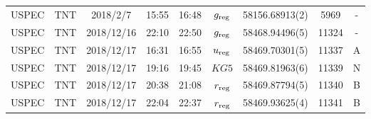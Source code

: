 \begin{table}
\begin{center}
\begin{tabular}{ccccccccc}
			USPEC & TNT     & 2018/2/7   & 15:55 & 16:48 & $g_{\rm reg}$                         & 58156.68913(2) &  5969 & - \\
			USPEC & TNT     & 2018/12/16 & 22:10 & 22:50 & $g_{\rm reg}$                         & 58468.94496(5) & 11324 & - \\
			USPEC & TNT     & 2018/12/17 & 16:31 & 16:55 & $u_{\rm reg}$                         & 58469.70301(5) & 11337 & A \\
			USPEC & TNT     & 2018/12/17 & 19:16 & 19:45 & $KG5$                                 & 58469.81963(6) & 11339 & N \\
			USPEC & TNT     & 2018/12/17 & 20:38 & 21:08 & $r_{\rm reg}$                         & 58469.87794(5) & 11340 & B \\
			USPEC & TNT     & 2018/12/17 & 22:04 & 22:37 & $r_{\rm reg}$                         & 58469.93625(4) & 11341 & B \\
		   \hline
		\end{tabular}
	\end{center}
\end{table}